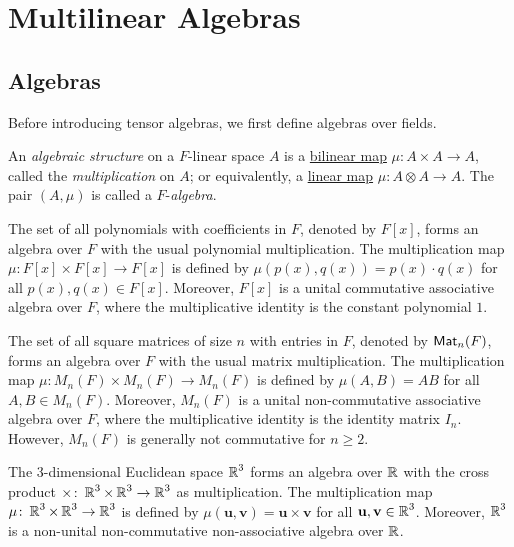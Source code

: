 \section{Multilinear Algebras}

\subsection{Algebras}
Before introducing tensor algebras, we first define algebras over fields.

\begin{definition}\label{def:algebraic_structure}
	An \emph{algebraic structure} on a $F$-linear space $A$ is a \hyperref[def:bilinear_map]{bilinear map} $\mu \colon A \times A \to A$, called the \emph{multiplication} on $A$; or equivalently, a \hyperref[def:linear_map]{linear map} $\mu \colon A \otimes A \to A$. The pair $(A, \mu)$ is called a $F$-\emph{algebra}.
\end{definition}

\begin{example}
	The set of all polynomials with coefficients in $F$, denoted by $F[x]$, forms an algebra over $F$ with the usual polynomial multiplication. The multiplication map $\mu \colon F[x] \times F[x] \to F[x]$ is defined by $\mu(p(x), q(x)) = p(x) \cdot q(x)$ for all $p(x), q(x) \in F[x]$. Moreover, $F[x]$ is a unital commutative associative algebra over $F$, where the multiplicative identity is the constant polynomial $1$.
\end{example}

\begin{example}
	The set of all square matrices of size $n$ with entries in $F$, denoted by $\operatorname{\text{\normalfont\sffamily Mat}}_n(F)$, forms an algebra over $F$ with the usual matrix multiplication. The multiplication map $\mu \colon M_n(F) \times M_n(F) \to M_n(F)$ is defined by $\mu(A, B) = AB$ for all $A, B \in M_n(F)$. Moreover, $M_n(F)$ is a unital non-commutative associative algebra over $F$, where the multiplicative identity is the identity matrix $I_n$. However, $M_n(F)$ is generally not commutative for $n \geq 2$.
\end{example}

\begin{example}
	The 3-dimensional Euclidean space $\operatorname{\mathbb{R}}^3$ forms an algebra over $\operatorname{\mathbb{R}}$ with the cross product $\times \colon \operatorname{\mathbb{R}}^3 \times \operatorname{\mathbb{R}}^3 \to \operatorname{\mathbb{R}}^3$ as multiplication. The multiplication map $\mu \colon \operatorname{\mathbb{R}}^3 \times \operatorname{\mathbb{R}}^3 \to \operatorname{\mathbb{R}}^3$ is defined by $\mu(\mathbf{u}, \mathbf{v}) = \mathbf{u} \times \mathbf{v}$ for all $\mathbf{u}, \mathbf{v} \in \operatorname{\mathbb{R}}^3$. Moreover, $\operatorname{\mathbb{R}}^3$ is a non-unital non-commutative non-associative algebra over $\operatorname{\mathbb{R}}$.
\end{example}

